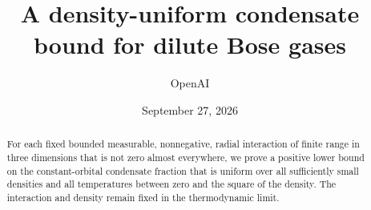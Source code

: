 \documentclass[11pt]{article}
\title{A density-uniform condensate bound for dilute Bose gases}
\author{OpenAI}
\date{September 27, 2026}
\theoremstyle{definition}
\theoremstyle{remark}
\begin{document}
\maketitle
\begin{abstract}
For each fixed bounded measurable, nonnegative, radial interaction of finite
range in three dimensions that is not zero almost everywhere, we prove
a positive lower bound on the constant-orbital
condensate fraction that is uniform over all sufficiently small densities
and all temperatures between zero and the square of the density.
The interaction and density remain fixed in the thermodynamic limit.
\end{abstract}
\tableofcontents













\end{document}
